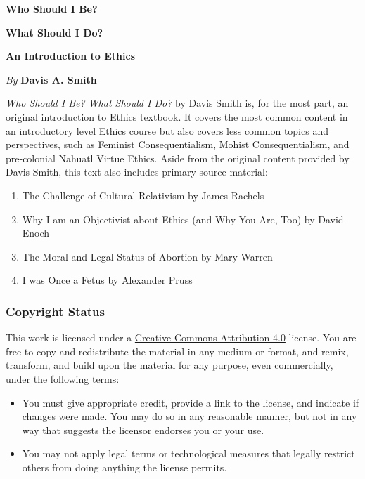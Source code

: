 \thispagestyle{empty}

\pagestyle{empty}

\vspace*{80pt}

\begin{raggedleft}
\fontsize{30pt}{24pt}\sffamily
\selectfont
  \textbf{Who Should I Be?}
  
  \textbf{What Should I Do?}

\medskip\fontsize{18pt}{20pt}\selectfont

\textbf{An Introduction to Ethics}

\vfill
\fontsize{12pt}{16pt}\selectfont \textit{By }  \textbf{Davis A. Smith}\\
\end{raggedleft}

\newpage

\noindent\fontsize{12pt}{16pt}\selectfont
\emph{Who Should I Be? What Should I Do?} by Davis Smith is, for the most part, an original introduction to Ethics textbook. It covers the most common content in an introductory level Ethics course but also covers less common topics and perspectives, such as Feminist Consequentialism, Mohist Consequentialism, and pre-colonial Nahuatl Virtue Ethics. Aside from the original content provided by Davis Smith, this text also includes primary source material:

\begin{enumerate}
\item The Challenge of Cultural Relativism by James Rachels
\item Why I am an Objectivist about Ethics (and Why You Are, Too) by David Enoch
\item The Moral and Legal Status of Abortion by Mary Warren
\item I was Once a Fetus by Alexander Pruss
\end{enumerate}

\subsubsection{Copyright Status}

This work is licensed under a \href{https://creativecommons.org/licenses/by/4.0/}{Creative Commons Attribution 4.0} license.
You are free to copy and redistribute the material in any medium or format, and  remix, transform, and build upon the material for any purpose, even commercially, under the following terms:
\begin{itemize}
\item You must give appropriate credit, provide a link to the license, and indicate if changes were made. You may do so in any reasonable manner, but not in any way that suggests the licensor endorses you or your use.
\item You may not apply legal terms or technological measures that legally restrict others from doing anything the license permits.
\end{itemize}

